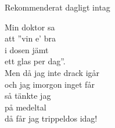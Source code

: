 \begin{song}{Rekommenderat dagligt intag}
	
	
	
	Min doktor sa\\
	att ''vin e' bra\\
	i dosen jämt\\
	ett glas per dag''.\\
	Men då jag inte drack igår\\
	och jag imorgon inget får\\
	så tänkte jag\\
	på medeltal\\
	då får jag trippeldos idag!
	
\end{song}
